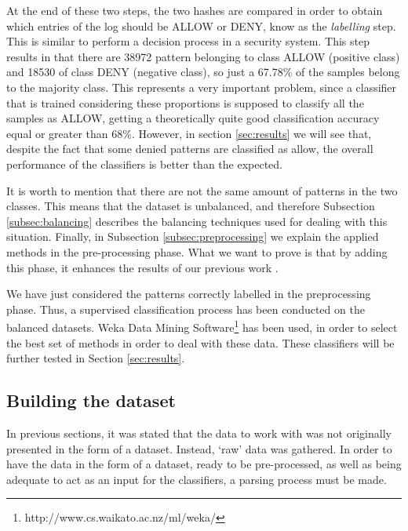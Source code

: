 \documentclass{llncs}
\begin{document}
At the end of these two steps, the two hashes are compared in order to obtain which entries of the log should be ALLOW or DENY, know as the \textit{labelling} step. This is similar to perform a decision process in a security system. This step results in that there are 38972 pattern belonging to class ALLOW (positive class) and 18530 of class DENY (negative class), so just a 67.78\% of the samples belong to the majority class. This represents a very important problem, since a classifier that is trained considering these proportions is supposed to classify all the samples as ALLOW, getting a theoretically quite good classification accuracy equal or greater than 68\%. However, in section \ref{sec:results} we will see that, despite the fact that some denied patterns are classified as allow, the overall performance of the classifiers is better than the expected.

It is worth to mention that there are not the same amount of patterns in the two classes. This means that the dataset is unbalanced, and therefore Subsection \ref{subsec:balancing} describes the balancing techniques used for dealing with this situation.
Finally, in Subsection \ref{subsec:preprocessing} we explain the applied methods in the pre-processing phase. What we want to prove is that by adding this phase, it enhances the results of our previous work \cite{ECTA}.

We have just considered the patterns correctly labelled in the preprocessing phase. Thus, a supervised classification process \cite{classification_67} has been conducted on the balanced datasets.
Weka Data Mining Software\footnote{http://www.cs.waikato.ac.nz/ml/weka/} has been used, in order to select the best set of methods in order to deal with these data. These classifiers will be further tested in Section \ref{sec:results}.

%
\subsection{Building the dataset}
\label{sec:buldingdataset}

In previous sections, it was stated that the data to work with was not originally presented in the form of a dataset. Instead, `raw' data was gathered. In order to have the data in the form of a dataset, ready to be pre-processed, as well as being adequate to act as an input for the classifiers, a parsing process must be made.
\end{document}
